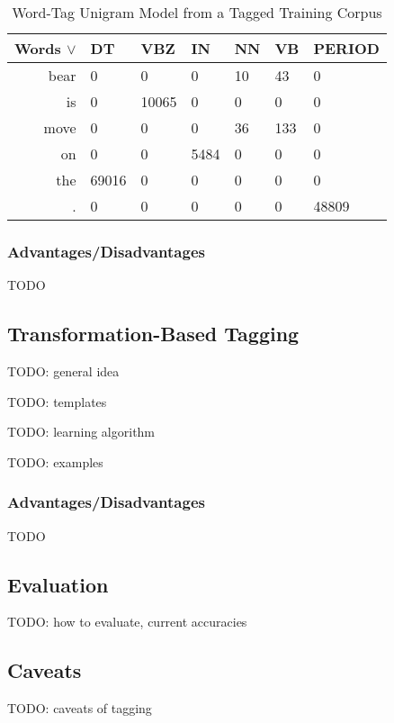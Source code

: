 \documentclass{article}
\begin{document}
\begin{table}
	\centering
	\begin{tabular}{r|llllll}
		\textbf{Words $\lor$} & DT & VBZ & IN & NN & VB & PERIOD \\
		\hline
		bear & 0 & 0 & 0 & 10 & 43 & 0 \\
		is & 0 & 10065 & 0 & 0 & 0 & 0 \\
		move & 0 & 0 & 0 & 36 & 133 & 0 \\
		on & 0 & 0 & 5484 & 0 & 0 & 0 \\
		the & 69016 & 0 & 0 & 0 & 0 & 0 \\
		. & 0 & 0 & 0 & 0 & 0 & 48809 \\
	\end{tabular}
	\caption{Word-Tag Unigram Model from a Tagged Training Corpus}
	\label{tab:word-tag-unigram-model}
\end{table}

\subsubsection{Advantages/Disadvantages}

TODO

\subsection{Transformation-Based Tagging}

TODO: general idea

TODO: templates

TODO: learning algorithm

TODO: examples

\subsubsection{Advantages/Disadvantages}

TODO

\subsection{Evaluation}

TODO: how to evaluate, current accuracies

\subsection{Caveats}

TODO: caveats of tagging
\end{document}
